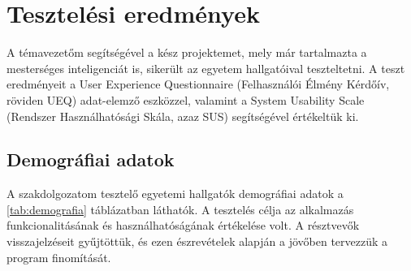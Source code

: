 \chapter{Tesztelési eredmények}

\thispagestyle{fancy}
\pagestyle{fancy}

A témavezetőm segítségével a kész projektemet, mely már tartalmazta a mesterséges inteligenciát is,  sikerült az egyetem hallgatóival teszteltetni.
A teszt eredményeit a User Experience Questionnaire (Felhasználói Élmény Kérdőív, röviden UEQ) adat-elemző eszközzel, valamint a System Usability Scale (Rendszer Használhatósági Skála, azaz SUS) segítségével értékeltük ki. 

\section{Demográfiai adatok}
A szakdolgozatom tesztelő egyetemi hallgatók demográfiai adatok a \ref{tab:demografia} táblázatban láthatók. A tesztelés célja az alkalmazás funkcionalitásának és használhatóságának értékelése volt. A résztvevők visszajelzéseit gyűjtöttük, és ezen észrevételek alapján a jövőben tervezzük a program finomítását.
\begin{table}[!h]
    \caption{Demográfiai adatok}
    \label{tab:demografia}
    \end{table}

